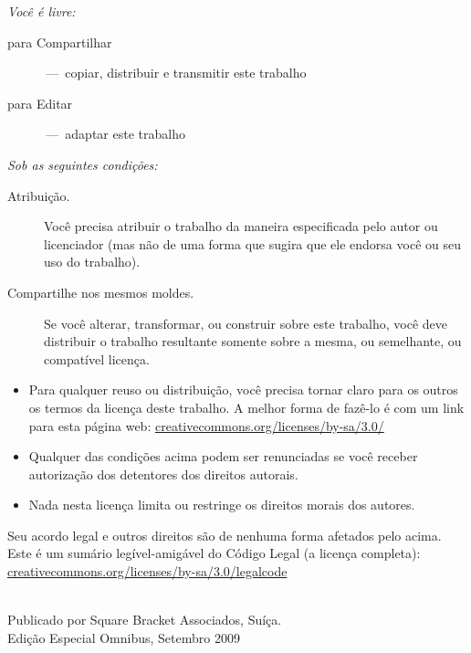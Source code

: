 \documentclass[a4paper,10pt,twoside]{book}
\begin{document}
\begin{footnotesize}
\emph{Você é livre:}
\begin{description}
  \item[para Compartilhar] \,---\, copiar, distribuir e transmitir este trabalho
  \item[para Editar] \,---\, adaptar este trabalho
\end{description}
\emph{Sob as seguintes condições:}
\begin{description}
  \item[Atribuição.] Você precisa atribuir o trabalho da maneira especificada pelo autor ou licenciador (mas não de uma forma que sugira que ele endorsa você ou seu uso do trabalho).
  \item[Compartilhe nos mesmos moldes.] Se você alterar, transformar, ou construir sobre este trabalho, você deve distribuir o trabalho resultante somente sobre a mesma, ou semelhante, ou compatível licença.
\end{description}
\begin{itemize}
  \item Para qualquer reuso ou distribuição, você precisa tornar claro para os outros os termos da licença deste trabalho. A melhor forma de fazê-lo é com um link para esta página web:
  \url{creativecommons.org/licenses/by-sa/3.0/}
  \item Qualquer das condições acima podem ser renunciadas se você receber autorização dos detentores dos direitos autorais.
  \item Nada nesta licença limita ou restringe os direitos morais dos autores.
\end{itemize}
\quad
\parbox{\textwidth-2cm-1em}{
	Seu acordo legal e outros direitos são de nenhuma forma afetados pelo acima.\\
	Este é um sumário legível-amigável do Código Legal (a licença completa):\\
	\url{creativecommons.org/licenses/by-sa/3.0/legalcode}}\\[1cm]
Publicado por Square Bracket Associados, Suíça. \sba\\
Edição Especial Omnibus, Setembro 2009
\end{footnotesize}
\vfill
%
\tableofcontents
\sloppy %


\mainmatter
\end{document}
